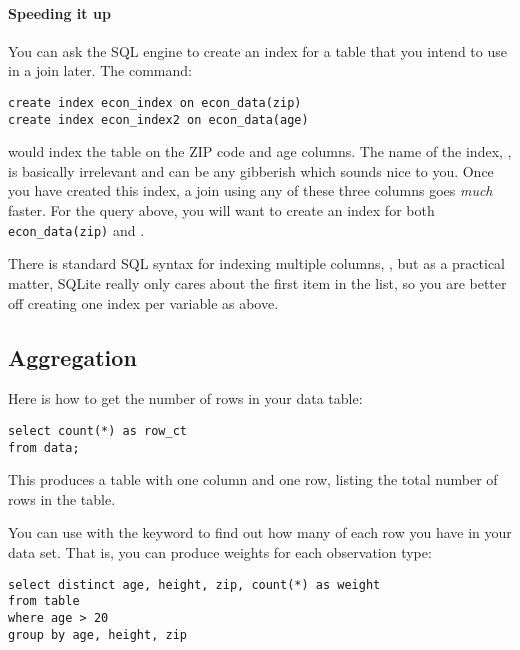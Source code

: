 \paragraph{Speeding it up}
You can ask the SQL engine to create an index for a table that you
intend to use in a join later. The command:
\begin{lstlisting}
create index econ_index on econ_data(zip)
create index econ_index2 on econ_data(age)
\end{lstlisting}
would index the table  on the ZIP code and age columns.
The name of the index, , is basically irrelevant and can
be any gibberish which sounds nice to you. Once you have created this
index, a join using any of these three columns goes {\sl much} faster.
For the query above, you will want to create an index for both {\tt
econ\_data(zip)} and .

There is standard SQL syntax for indexing multiple columns, 
, but as a
practical matter, SQLite really only cares about the first item in the
list, so you are better off creating one index per variable as above.

\subsection{Aggregation}
Here is how to get the number of rows in your data table:
\begin{lstlisting}
select count(*) as row_ct 
from data;
\end{lstlisting}
This produces a table with one column and one row, listing the total
number of rows in the  table.

You can use  with the  keyword to find out how
many of each row you have in your data set. That is, you can produce
weights for each observation type:

\begin{lstlisting}
select distinct age, height, zip, count(*) as weight
from table
where age > 20
group by age, height, zip
\end{lstlisting}

